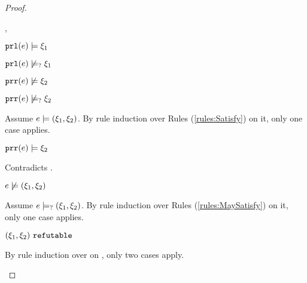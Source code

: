 \begin{proof}
\begin{byCases}
\begin{byCases}
\begin{byCases}
        \item[\csatisfy{\hprl{e}}{\xi_1},\cnotsatisfyormay{\hprr{e}}{\xi_2}]
            \begin{pfsteps*}
            \item $\mathtt{prl}(e) \models \xi_1$  
            \item $\mathtt{prl}(e) \not\models_{?} \xi_1$  
            \item $\mathtt{prr}(e) \not\models \xi_2$  
            \item $\mathtt{prr}(e) \not\models_{?} \xi_2$  
            \end{pfsteps*}
            Assume $e \models (\xi_1 , \xi_2)$. By rule induction over Rules (\ref{rules:Satisfy}) on it, only one case applies.
            \begin{byCases}
            \item[\text{(\ref{rule:CSNotValPair})}]
                \begin{pfsteps*}
                \item $\mathtt{prr}(e) \models \xi_2$ 
                \end{pfsteps*}
                Contradicts .
            \end{byCases}
            \begin{pfsteps*}
            \item $e \not\models (\xi_1 , \xi_2)$  
            \end{pfsteps*}
            Assume $e \models_{?} (\xi_1 , \xi_2)$. By rule induction over Rules (\ref{rules:MaySatisfy}) on it, only one case applies.
            \begin{byCases}
            \item[\text{(\ref{rule:CMSNotVal})}]
                \begin{pfsteps*}
                \item $(\xi_1 , \xi_2) ~\mathtt{refutable}$  
                \end{pfsteps*}
                By rule induction over  on , only two cases apply.
                \begin{byCases}
                \item[\text{(\ref{rule:RXPairL})}]

\end{byCases}
\end{byCases}
\end{byCases}
\end{byCases}
\end{byCases}
\end{proof}

